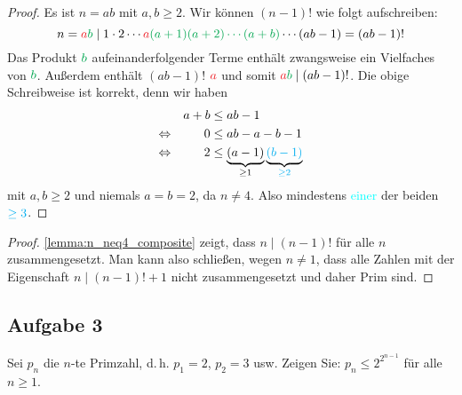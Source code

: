 \begin{proof}
  Es ist $n = ab$ mit $a,b \geq 2$. Wir können $(n - 1)!$ wie folgt aufschreiben:
  \begin{equation*}
    n = \textcolor{Red}{a}\textcolor{Green}{b} \mid
    1 \cdot 2 \dotsm \textcolor{Red}{a}
    \textcolor{Green}{(a + 1)(a + 2) \dotsm (a + b)}
    \dotsm (ab - 1) = (ab - 1)!
  \end{equation*}
  Das Produkt $\textcolor{Green}{b}$ aufeinanderfolgender Terme
  enthält zwangsweise ein Vielfaches von $\textcolor{Green}{b}$.
  Außerdem enthält $(ab - 1)!$ $\textcolor{Red}{a}$ und somit
  $\textcolor{Red}{a}\textcolor{Green}{b} \mid (ab - 1)!$.\bignewline
  Die obige Schreibweise ist korrekt, denn wir haben
  \begin{equation*}
    \begin{aligned}
                      &  & a + b & \leq ab - 1                          \\
      \Leftrightarrow &  & 0     & \leq ab - a - b - 1                  \\
      \Leftrightarrow &  & 2     & \leq \underbrace{(a - 1)}_{\geq 1}
      \underbrace{\textcolor{Cyan}{(b - 1)}}_{\textcolor{Cyan}{\geq 2}} \\
    \end{aligned}
  \end{equation*}
  mit $a,b \geq 2$ und niemals $a = b = 2$, da $n \neq 4$.
  Also mindestens \textcolor{Cyan}{einer} der beiden $\textcolor{Cyan}{\geq 3}$.
\end{proof}

\begin{proof}
  \autoref{lemma:n_neq4_composite} zeigt, dass $n \mid (n - 1)!$ für alle $n$ zusammengesetzt.
  Man kann also schließen, wegen $n \neq 1$,
  dass alle Zahlen mit der Eigenschaft $n \mid (n - 1)! + 1$
  nicht zusammengesetzt und daher Prim sind.
\end{proof}

\subsection{Aufgabe 3}
Sei $p_n$ die $n$-te Primzahl, d.\,h. $p_1 = 2$, $p_2 = 3$ usw. Zeigen Sie:
$p_n \leq 2^{2^{n - 1}}$ für alle $n \geq 1$.

